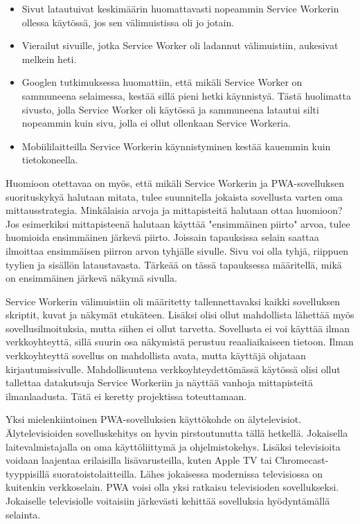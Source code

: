 \documentclass{tktltiki}
\begin{document}
\begin{itemize}
  \item Sivut latautuivat keskimäärin huomattavasti nopeammin Service Workerin ollessa käytössä, jos sen välimuistissa oli jo jotain.
  \item Vierailut sivuille, jotka Service Worker oli ladannut välimuistiin, aukesivat melkein heti.
  \item Googlen tutkimuksessa huomattiin, että mikäli Service Worker on sammuneena selaimessa, kestää sillä pieni hetki käynnistyä. Tästä huolimatta sivusto, jolla Service Worker oli käytössä ja sammuneena latautui silti nopeammin kuin sivu, jolla ei ollut ollenkaan Service Workeria.
  \item Mobiililaitteilla Service Workerin käynnistyminen kestää kauemmin kuin tietokoneella.
\end{itemize}

Huomioon otettavaa on myös, että mikäli Service Workerin ja PWA-sovelluksen suorituskykyä halutaan mitata, tulee suunnitella jokaista sovellusta varten oma mittausstrategia. Minkälaisia arvoja ja mittapisteitä halutaan ottaa huomioon? Jos esimerkiksi mittapisteenä halutaan käyttää "ensimmäinen piirto" arvoa, tulee huomioida ensimmäinen järkevä piirto. Joissain tapauksissa selain saattaa ilmoittaa ensimmäisen piirron arvon tyhjälle sivulle. Sivu voi olla tyhjä, riippuen tyylien ja sisällön lataustavasta. Tärkeää on tässä tapauksessa määritellä, mikä on ensimmäinen järkevä näkymä sivulla.  

Service Workerin välimuistiin oli määritetty tallennettavaksi kaikki sovelluksen skriptit, kuvat ja näkymät etukäteen. Lisäksi olisi ollut mahdollista lähettää myös sovellusilmoituksia, mutta siihen ei ollut tarvetta. Sovellusta ei voi käyttää ilman verkkoyhteyttä, sillä suurin osa näkymistä perustuu reaaliaikaiseen tietoon. Ilman verkkoyhteyttä sovellus on mahdollista avata, mutta käyttäjä ohjataan kirjautumissivulle. Mahdollisuutena verkkoyhteydettömässä käytössä olisi ollut tallettaa datakutsuja Service Workeriin ja näyttää vanhoja mittapisteitä ilmanlaadusta. Tätä ei keretty projektissa toteuttamaan.

Yksi mielenkiintoinen PWA-sovelluksien käyttökohde on älytelevisiot. Älytelevisioiden sovelluskehitys on hyvin pirstoutunutta tällä hetkellä. Jokaisella laitevalmistajalla on oma käyttöliittymä ja ohjelmistokehys. Lisäksi televisioita voidaan laajentaa erilaisilla lisävarusteilla, kuten Apple TV tai Chromecast-tyyppisillä suoratoistolaitteilla. Lähes jokaisessa modernissa televisiossa on kuitenkin verkkoselain. PWA voisi olla yksi ratkaisu televisioden sovellukseksi. Jokaiselle televisiolle voitaisiin järkevästi kehittää sovelluksia hyödyntämällä selainta.
\end{document}

